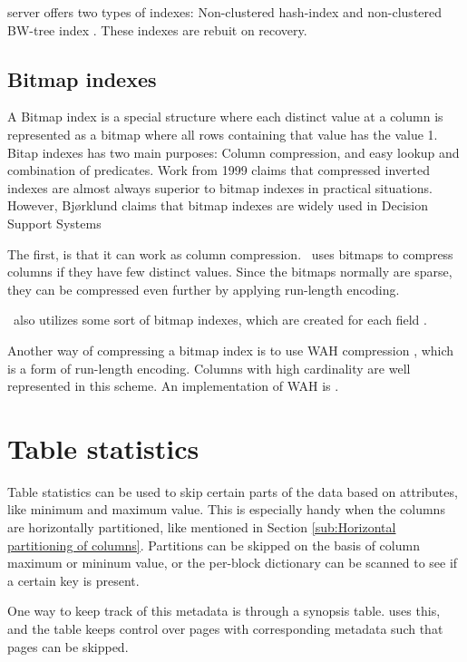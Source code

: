 \mssql server offers two types of indexes: Non-clustered hash-index and non-clustered BW-tree index \cite{Delaney2014-ip, noauthor_undated-vq}. These indexes are rebuit on recovery.

\subsection{Bitmap indexes}
\label{sub:Bitmap indexes}
A Bitmap index is a special structure where each distinct value at a column is represented as a bitmap where all rows containing that value has the value 1. Bitap indexes has two main purposes: Column compression, and easy lookup and combination of predicates. Work from 1999 \cite{Witten1999-qq} claims that compressed inverted indexes are almost always superior to bitmap indexes in practical situations. However, Bjørklund claims that bitmap indexes are widely used in Decision Support Systems \cite{Bjorklund2011-wh}

The first, is that it can work as column compression. \cstore~uses bitmaps to compress columns if they have few distinct values. Since the bitmaps normally are sparse, they can be compressed even further by applying run-length encoding.

\qlikview~also utilizes some sort of bitmap indexes, which are created for each field \cite{Qlik2011-ef}.

Another way of compressing a bitmap index is to use WAH compression \cite{Bjorklund2011-wh}, which is a form of run-length encoding. Columns with high cardinality are well represented in this scheme. An implementation of WAH is .


\section{Table statistics}
\label{sec:Metadata indexes}
Table statistics can be used to skip certain parts of the data based on attributes, like minimum and maximum value. This is especially handy when the columns are horizontally partitioned, like mentioned in Section \ref{sub:Horizontal partitioning of columns}. Partitions can be skipped on the basis of column maximum or mininum value, or the per-block dictionary can be scanned to see if a certain key is present.

One way to keep track of this metadata is through a synopsis table. \ibm uses this, and the table keeps control over pages with corresponding metadata such that pages can be skipped.

